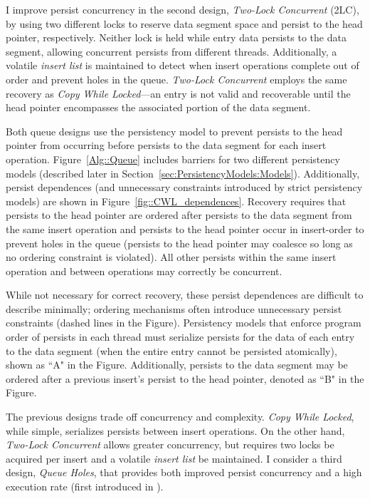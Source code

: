 I improve persist concurrency in the second design, \emph{Two-Lock Concurrent} (2LC), by using two different locks to reserve data segment space and persist to the head pointer, respectively.
Neither lock is held while entry data persists to the data segment, allowing concurrent persists from different threads.
Additionally, a volatile \emph{insert list} is maintained to detect when insert operations complete out of order and prevent holes in the queue.
\emph{Two-Lock Concurrent} employs the same recovery as \emph{Copy While Locked}---an entry is not valid and recoverable until the head pointer encompasses the associated portion of the data segment.



Both queue designs use the persistency model to prevent persists to the head pointer from occurring before persists to the data segment for each insert operation.
Figure~\ref{Alg::Queue} includes barriers for two different persistency models (described later in Section~\ref{sec:PersistencyModels:Models}).
Additionally, persist dependences (and unnecessary constraints introduced by strict persistency models) are shown in Figure~\ref{fig::CWL_dependences}.
Recovery requires that persists to the head pointer are ordered after persists to the data segment from the same insert operation and persists to the head pointer occur in insert-order to prevent holes in the queue (persists to the head pointer may coalesce so long as no ordering constraint is violated).
All other persists within the same insert operation and between operations may correctly be concurrent.

While not necessary for correct recovery, these persist dependences are difficult to describe minimally; ordering mechanisms often introduce unnecessary persist constraints (dashed lines in the Figure).
Persistency models that enforce program order of persists in each thread must serialize persists for the data of each entry to the data segment (when the entire entry cannot be persisted atomically), shown as ``A" in the Figure.
Additionally, persists to the data segment may be ordered after a previous insert's persist to the head pointer, denoted as ``B" in the Figure.

The previous designs trade off concurrency and complexity.
\emph{Copy While Locked}, while simple, serializes persists between insert operations.
On the other hand, \emph{Two-Lock Concurrent} allows greater concurrency, but requires two locks be acquired per insert and a volatile \emph{insert list} be maintained.
I consider a third design, \emph{Queue Holes}, that provides both improved persist concurrency and a high execution rate (first introduced in \cite{FangHsiao11}).

